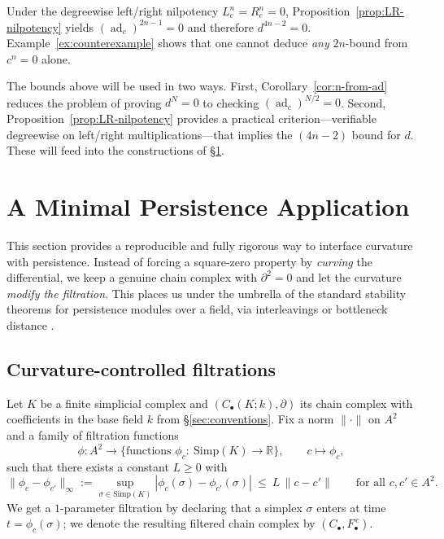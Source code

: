 \documentclass[preprint,12pt]{elsarticle}
\newcommand{\ad}{\operatorname{ad}}
\begin{document}
\begin{rmk}\label{rem:4n-2}
Under the degreewise left/right nilpotency $L_c^n=R_c^n=0$, Proposition~\ref{prop:LR-nilpotency}
yields $(\ad_c)^{2n-1}=0$ and therefore $d^{4n-2}=0$. Example~\ref{ex:counterexample} shows
that one cannot deduce \emph{any} $2n$-bound from $c^n=0$ alone.
\end{rmk}

The bounds above will be used in two ways. First, Corollary~\ref{cor:n-from-ad} reduces the
problem of proving $d^N=0$ to checking $(\ad_c)^{N/2}=0$. Second, Proposition~\ref{prop:LR-nilpotency}
provides a practical criterion---verifiable degreewise on left/right multiplications---that implies
the $(4n-2)$ bound for $d$. These will feed into the constructions of §\ref{sec:persistence}.

\section{A Minimal Persistence Application}\label{sec:persistence}

This section provides a reproducible and fully rigorous way to interface curvature with persistence.
Instead of forcing a square-zero property by \emph{curving} the differential, we keep a genuine
chain complex with $\partial^2=0$ and let the curvature \emph{modify the filtration}.
This places us under the umbrella of the standard stability theorems for persistence
modules over a field, via interleavings or bottleneck distance
\cite{CohenSteinerEdelsbrunnerHarer2007,ChazalDeSilvaGlisseOudot2016}.

\subsection{Curvature-controlled filtrations}\label{subsec:curv-filtration}
Let $K$ be a finite simplicial complex and $(C_\bullet(K;k),\partial)$ its chain complex with coefficients
in the base field $k$ from \S\ref{sec:conventions}. Fix a norm $\|\cdot\|$ on $A^2$ and a family of
filtration functions
\[
\phi: A^2 \longrightarrow \{\text{functions } \phi_c:\ \mathrm{Simp}(K)\to\mathbb{R}\},\qquad
c\longmapsto \phi_c,
\]
such that there exists a constant $L\ge 0$ with
\begin{equation}\label{eq:Lip}
\|\phi_c-\phi_{c'}\|_\infty := \sup_{\sigma\in \mathrm{Simp}(K)} |\phi_c(\sigma)-\phi_{c'}(\sigma)|
\ \le\ L\,\|c-c'\|\qquad \text{for all } c,c'\in A^2.
\end{equation}
We get a $1$-parameter filtration by declaring that a simplex $\sigma$ enters at time
$t=\phi_c(\sigma)$; we denote the resulting filtered chain complex by $(C_\bullet,F^{\,c}_\bullet)$.
\end{document}
